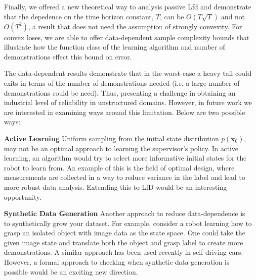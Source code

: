 \documentclass[10pt, conference]{ieeeconf}      %
\newcommand{\bx}{\mathbf{x}}
\begin{document}
Finally, we offered a new theoretical  way to analysis passive Lfd and demonstrate that the depedence on the time horizon constant, $T$, can be $O(T\sqrt{T})$ and not $O(T^2)$, a result that does not need the assumption of strongly convexity.  For convex loses, we are able to offer data-dependent sample complexity bounds that illustrate how the function class of the learning algorithm and number of demonstrations effect this bound on error. 

The data-dependent results demonstrate that in the worst-case a heavy tail could exits in terms of the number of demonstrations needed (i.e. a large number of demonstrations could be need). Thus, presenting a challenge in obtaining an industrial level of reliability in unstructured domains. However, in future work we are interested in examining ways around this limitation. Below are two possible ways:

\noindent \textbf{Active Learning} Uniform sampling from the initial state distribution $p(\bx_0)$, may not be an optimal approach to learning the supervisor's policy. In active learning, an algorithm would try to select more informative initial states for the robot to learn from. An example of this is the field of optimal design, where measurements are collected in a way to reduce variance in the label and lead to more robust data analysis. Extending this to LfD would be an interesting opportunity. 

\noindent \textbf{Synthetic Data Generation} Another approach to reduce data-dependence is to synthetically grow your dataset. For example, consider a robot learning how to grasp an isolated object  with image data as the state space. One could take the given image state and translate both the object and grasp label to create more demonstrations. A similar approach has been used recently in self-driving cars. However, a formal approach to checking when synthetic data generation is possible would be an exciting new direction. 



\end{document}

